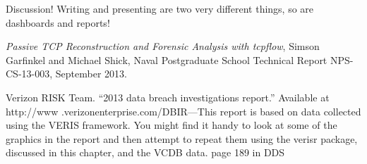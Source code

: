 \documentclass[Screen16to9,17pt]{foils}
\begin{document}



Discussion! Writing and presenting are two very different things, so are dashboards and reports!





\begin{list2}
  \item {}
  \item \emph{Passive TCP Reconstruction and Forensic Analysis with tcpflow}, Simson Garfinkel and Michael Shick, Naval Postgraduate School Technical Report NPS-CS-13-003, September 2013.
\end{list2}

\slide{}


\begin{quote}

\end{quote}

\begin{list2}
  \item
\end{list2}





\begin{quote}

\end{quote}

\begin{list2}
  \item
\end{list2}

Verizon RISK Team. “2013 data breach investigations report.” Available at http://www
.verizonenterprise.com/DBIR—This report is based on data collected using the VERIS
framework. You might find it handy to look at some of the graphics in the report and then attempt
to repeat them using the verisr package, discussed in this chapter, and the VCDB data.
page 189 in DDS



\slide{}


\begin{quote}

\end{quote}
\end{document}
